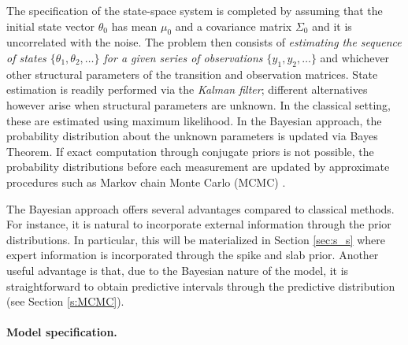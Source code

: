 


The specification of the state-space system is completed by assuming that the initial state vector $\theta_0$ has mean $\mu_0$ and a covariance matrix $\Sigma_0$ and it is uncorrelated with the noise. The problem then consists of \emph{estimating the sequence of states $\{\theta_1, \theta_2, \ldots\}$ for a given series of observations $\{y_1, y_2, \ldots\}$} and whichever other structural parameters of the transition and observation matrices. State estimation is readily performed via the \emph{Kalman filter};  different alternatives however arise  when structural parameters are unknown. In the classical setting, these are estimated using maximum likelihood. In the Bayesian approach, the probability distribution about the unknown parameters is updated via Bayes Theorem. If exact computation through conjugate priors is not possible, the probability distributions before each measurement are updated by approximate procedures such as Markov chain Monte Carlo (MCMC) \parencite{scott2014predicting}. 

The Bayesian approach offers several advantages compared to classical methods. For instance, it is natural to incorporate external information through the prior distributions. In particular, this will be materialized in Section \ref{sec:s_s} where expert information is incorporated through the spike and slab prior. Another useful advantage is that, due to the Bayesian nature of the model, it is straightforward to obtain predictive intervals through the predictive distribution (see Section \ref{s:MCMC}).


\paragraph{Model specification.}\label{sec:model}





